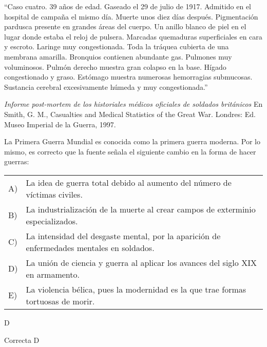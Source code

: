 \documentclass[letterpaper,11pt]{article}
\newcommand{\anchopregunta}{0.9\textwidth}
\begin{document}
\begin{enumerate}
\begin{minipage}{\anchopregunta}
\item ``Caso cuatro. 39 años de edad. Gaseado el 29 de julio de 1917. Admitido en el hospital de campaña el mismo día. Muerte unos diez días después. Pigmentación pardusca presente en grandes áreas del cuerpo. Un anillo blanco de piel en el lugar donde estaba el reloj de pulsera. Marcadas quemaduras superficiales en cara y escroto. Laringe muy congestionada. Toda la tráquea cubierta de una membrana amarilla. Bronquios contienen abundante gas. Pulmones muy voluminosos. Pulmón derecho muestra gran colapso en la base. Hígado congestionado y graso. Estómago muestra numerosas hemorragias submucosas. Sustancia cerebral excesivamente húmeda y muy congestionada.''
\begin{flushright}
\textit{Informe post-mortem de los historiales médicos oficiales de soldados británicos} En Smith, G. M., Casualties and Medical Statistics of the Great War. Londres: Ed. Museo Imperial de la Guerra, 1997.
\end{flushright}
La Primera Guerra Mundial es conocida como la primera guerra moderna. Por lo mismo, es correcto que la fuente señala el siguiente cambio en la forma de hacer guerras:
\begin{flushleft}\begin{tabular}{@{\hspace{-.001\textwidth}}l@{\hspace{2pt}}p{}}
A)& La idea de guerra total debido al aumento del número de víctimas civiles.\\
B)& La industrialización de la muerte al crear campos de exterminio especializados.\\
C)& La intensidad del desgaste mental, por la aparición de enfermedades mentales en soldados.\\
D)& La unión de ciencia y guerra al aplicar los avances del siglo XIX en armamento.\\
E)& La violencia bélica, pues la modernidad es la que trae formas tortuosas de morir.\\ 
\end{tabular}\end{flushleft}%
\begin{key} D
\end{key} 
\begin{hint}
\end{hint}
\begin{answer} Correcta D \\
\end{answer}

\end{minipage}
\end{enumerate}
\end{document}
